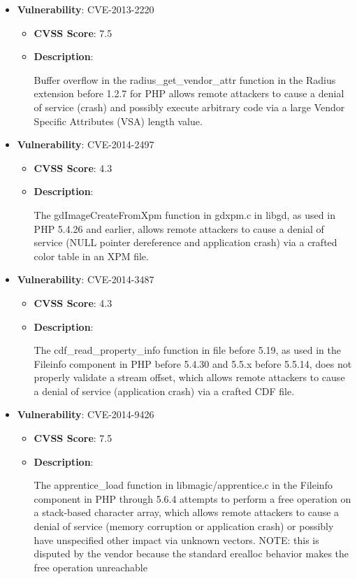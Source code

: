 \documentclass{article}
\begin{document}
\begin{itemize}
        \item \textbf{Vulnerability}: CVE-2013-2220
        \begin{itemize}
            \item \textbf{CVSS Score}:  7.5 
            \item \textbf{Description}:
            \parbox[t]{0.9\linewidth}{
                \ttfamily Buffer overflow in the radius\_get\_vendor\_attr function in the Radius extension before 1.2.7 for PHP allows remote attackers to cause a denial of service (crash) and possibly execute arbitrary code via a large Vendor Specific Attributes (VSA) length value.
            }
        \end{itemize}
    
        \item \textbf{Vulnerability}: CVE-2014-2497
        \begin{itemize}
            \item \textbf{CVSS Score}:  4.3 
            \item \textbf{Description}:
            \parbox[t]{0.9\linewidth}{
                \ttfamily The gdImageCreateFromXpm function in gdxpm.c in libgd, as used in PHP 5.4.26 and earlier, allows remote attackers to cause a denial of service (NULL pointer dereference and application crash) via a crafted color table in an XPM file.
            }
        \end{itemize}
    
        \item \textbf{Vulnerability}: CVE-2014-3487
        \begin{itemize}
            \item \textbf{CVSS Score}:  4.3 
            \item \textbf{Description}:
            \parbox[t]{0.9\linewidth}{
                \ttfamily The cdf\_read\_property\_info function in file before 5.19, as used in the Fileinfo component in PHP before 5.4.30 and 5.5.x before 5.5.14, does not properly validate a stream offset, which allows remote attackers to cause a denial of service (application crash) via a crafted CDF file.
            }
        \end{itemize}
    
        \item \textbf{Vulnerability}: CVE-2014-9426
        \begin{itemize}
            \item \textbf{CVSS Score}:  7.5 
            \item \textbf{Description}:
            \parbox[t]{0.9\linewidth}{
                \ttfamily The apprentice\_load function in libmagic/apprentice.c in the Fileinfo component in PHP through 5.6.4 attempts to perform a free operation on a stack-based character array, which allows remote attackers to cause a denial of service (memory corruption or application crash) or possibly have unspecified other impact via unknown vectors.  NOTE: this is disputed by the vendor because the standard erealloc behavior makes the free operation unreachable
            }
        \end{itemize}
    

\end{itemize}
\end{document}
